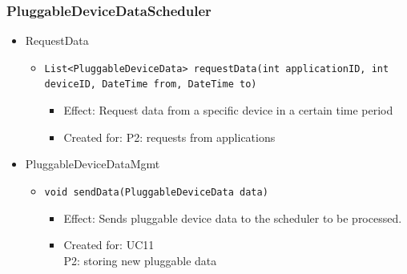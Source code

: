     \subsubsection{PluggableDeviceDataScheduler}
        \begin{itemize}
            \item RequestData
            \begin{itemize}
                \item \texttt{List<PluggableDeviceData> requestData(int applicationID, int deviceID, DateTime from, DateTime to)}
                \begin{itemize}
                    \item Effect: Request data from a specific device in a certain time period
                    \item Created for: P2: requests from applications
                \end{itemize}
            \end{itemize}

            \item PluggableDeviceDataMgmt
            \begin{itemize}
                \item \texttt{void sendData(PluggableDeviceData data)}
                \begin{itemize}
                    \item Effect: Sends pluggable device data to the scheduler to be processed.
                    \item Created for: UC11 \\
                          P2: storing new pluggable data
                \end{itemize}
            \end{itemize}
        \end{itemize}

